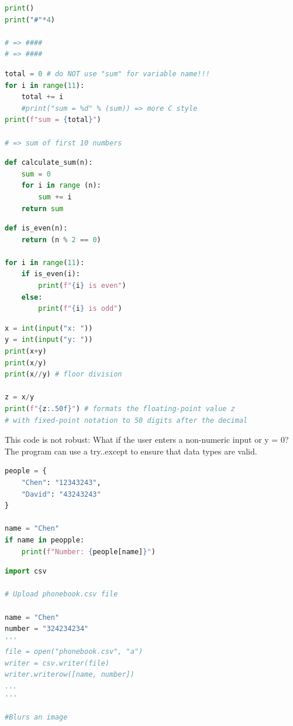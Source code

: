 {\begin{lstlisting}[language=Python, breaklines=true]
print()
print("#"*4)

# => ####
# => ####
\end{lstlisting}
\vspace{11pt}
\begin{lstlisting}[language=Python, breaklines=true]
total = 0 # do NOT use "sum" for variable name!!!
for i in range(11):
    total += i
    #print("sum = %d" % (sum)) => more C style
print(f"sum = {total}")

# => sum of first 10 numbers
\end{lstlisting}
\vspace{11pt}
\begin{lstlisting}[language=Python, breaklines=true]
def calculate_sum(n):
    sum = 0
    for i in range (n):
        sum += i
    return sum
\end{lstlisting}
\vspace{11pt}
\begin{lstlisting}[language=Python, breaklines=true]
def is_even(n):
    return (n % 2 == 0)

for i in range(11):
    if is_even(i):
        print(f"{i} is even")
    else:
        print(f"{i} is odd")
\end{lstlisting}
\vspace{11pt}
\begin{lstlisting}[language=Python, breaklines=true]
x = int(input("x: "))
y = int(input("y: "))
print(x+y)
print(x/y)
print(x//y) # floor division

z = x/y
print(f"{z:.50f}") # formats the floating-point value z 
# with fixed-point notation to 50 digits after the decimal
\end{lstlisting}
\vspace{11pt}
This code is not robust: What if the user enters a non-numeric input or y = 0? The program can use a try..except to ensure that data types are valid.
\vspace{11pt}
\begin{lstlisting}[language=Python, breaklines=true]
people = {
    "Chen": "12343243",
    "David": "43243243"
}

name = "Chen"
if name in peopple:
    print(f"Number: {people[name]}")
\end{lstlisting}

\begin{lstlisting}[language=Python, breaklines=true]
import csv

# Upload phonebook.csv file

name = "Chen"
number = "324234234"
'''
file = open("phonebook.csv", "a")
writer = csv.writer(file)
writer.writerow([name, number])
...
'''
\end{lstlisting}
\vspace{11pt}
\begin{lstlisting}[language=Python, breaklines=true]
#Blurs an image


\end{lstlisting}}
